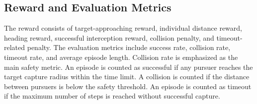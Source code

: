 \subsection{Reward and Evaluation Metrics}

The reward consists of target-approaching reward, individual distance reward, heading reward, successful interception reward, collision penalty, and timeout-related penalty. The evaluation metrics include success rate, collision rate, timeout rate, and average episode length. Collision rate is emphasized as the main safety metric. An episode is counted as successful if any pursuer reaches the target capture radius within the time limit. A collision is counted if the distance between pursuers is below the safety threshold. An episode is counted as timeout if the maximum number of steps is reached without successful capture.

